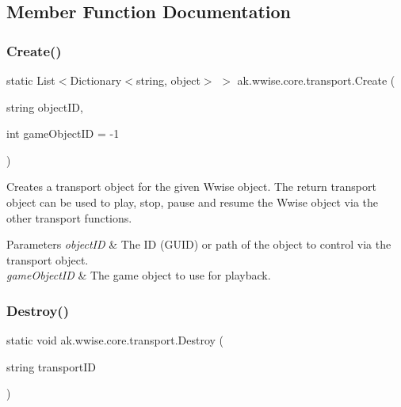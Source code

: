 \subsection{Member Function Documentation}
\mbox{\label{classak_1_1wwise_1_1core_1_1transport_a50ec44c5163f7dccdc5da5e9a679d6d8}} 
\subsubsection{\texorpdfstring{Create()}{Create()}}
{\footnotesize\ttfamily static List$<$Dictionary$<$string, object$>$ $>$ ak.\+wwise.\+core.\+transport.\+Create (\begin{DoxyParamCaption}\item[{string}]{object\+ID,  }\item[{int}]{game\+Object\+ID = {\ttfamily -\/1} }\end{DoxyParamCaption})\hspace{0.3cm}{\ttfamily [static]}}



Creates a transport object for the given Wwise object. The return transport object can be used to play, stop, pause and resume the Wwise object via the other transport functions. 


\begin{DoxyParams}{Parameters}
{\em object\+ID} & The ID (G\+U\+ID) or path of the object to control via the transport object.\\
\hline
{\em game\+Object\+ID} & The game object to use for playback.\\
\hline
\end{DoxyParams}
\mbox{\label{classak_1_1wwise_1_1core_1_1transport_ad2da39e96d6afd24fe3fa62e638aeefe}} 
\subsubsection{\texorpdfstring{Destroy()}{Destroy()}}
{\footnotesize\ttfamily static void ak.\+wwise.\+core.\+transport.\+Destroy (\begin{DoxyParamCaption}\item[{string}]{transport\+ID }\end{DoxyParamCaption})\hspace{0.3cm}{\ttfamily [static]}}



